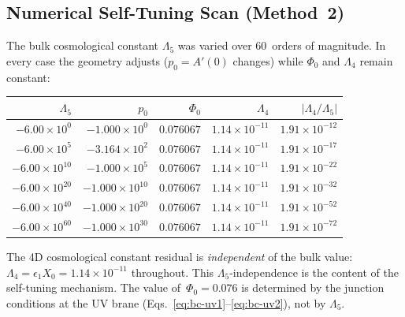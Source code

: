 \subsection{Numerical Self-Tuning Scan (Method~2)}
\label{app:selftuning-scan}

The bulk cosmological constant $\Lambda_5$ was varied over 60~orders of magnitude. In every case the geometry adjusts ($p_0 = A'(0)$ changes) while $\Phi_0$ and $\Lambda_4$ remain constant:

\begin{center}
\begin{tabular}{r r r r r}
\hline
$\Lambda_5$ & $p_0$ & $\Phi_0$ & $\Lambda_4$ & $|\Lambda_4 / \Lambda_5|$ \\
\hline
$-6.00 \times 10^{0}$ & $-1.000 \times 10^{0}$ & $0.076067$ & $1.14 \times 10^{-11}$ & $1.91 \times 10^{-12}$ \\
$-6.00 \times 10^{5}$ & $-3.164 \times 10^{2}$ & $0.076067$ & $1.14 \times 10^{-11}$ & $1.91 \times 10^{-17}$ \\
$-6.00 \times 10^{10}$ & $-1.000 \times 10^{5}$ & $0.076067$ & $1.14 \times 10^{-11}$ & $1.91 \times 10^{-22}$ \\
$-6.00 \times 10^{20}$ & $-1.000 \times 10^{10}$ & $0.076067$ & $1.14 \times 10^{-11}$ & $1.91 \times 10^{-32}$ \\
$-6.00 \times 10^{40}$ & $-1.000 \times 10^{20}$ & $0.076067$ & $1.14 \times 10^{-11}$ & $1.91 \times 10^{-52}$ \\
$-6.00 \times 10^{60}$ & $-1.000 \times 10^{30}$ & $0.076067$ & $1.14 \times 10^{-11}$ & $1.91 \times 10^{-72}$ \\
\hline
\end{tabular}
\end{center}

\noindent
The 4D cosmological constant residual is \emph{independent} of the bulk value: $\Lambda_4 = \epsilon_1 X_0 = 1.14 \times 10^{-11}$ throughout. This $\Lambda_5$-independence is the content of the self-tuning mechanism. The value of~$\Phi_0 = 0.076$ is determined by the junction conditions at the UV brane (Eqs.~\eqref{eq:bc-uv1}--\eqref{eq:bc-uv2}), not by $\Lambda_5$.

